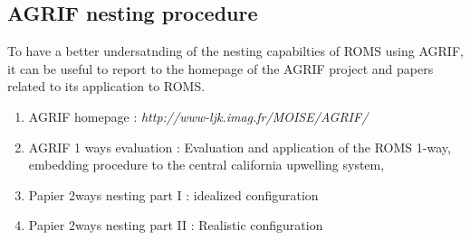\subsection{AGRIF nesting procedure}
\label{sec:2-ways-nesting}
To have a better undersatnding of the nesting capabilties of ROMS using AGRIF, it can
be useful to report to the homepage of the AGRIF project and  papers related to its
application to ROMS.
\begin{enumerate}
\item  AGRIF homepage : \textit{http://www-ljk.imag.fr/MOISE/AGRIF/}
\item  AGRIF 1 ways evaluation : Evaluation and application of the ROMS 1-way, 
embedding procedure to the central california upwelling system, \citep{Pen04}
\item  Papier 2ways nesting part I : idealized configuration
\item  Papier 2ways nesting part II : Realistic configuration
\end{enumerate}


